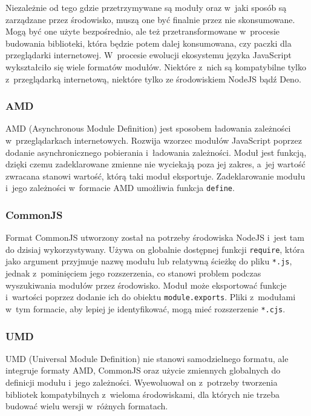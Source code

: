Niezależnie od tego gdzie przetrzymywane są moduły oraz w~jaki sposób są zarządzane przez środowisko, muszą one być finalnie przez nie skonsumowane. Mogą być one użyte bezpośrednio, ale też przetransformowane w~procesie budowania biblioteki, która będzie potem dalej konsumowana, czy paczki dla przeglądarki internetowej. W~procesie ewolucji ekosystemu języka JavaScript wykształciło się wiele formatów modułów. Niektóre z~nich są kompatybilne tylko z~przeglądarką internetową, niektóre tylko ze środowiskiem NodeJS bądź Deno.  

\subsubsection{AMD}

AMD (Asynchronous Module Definition) jest sposobem ładowania zależności w~przeglądarkach internetowych. Rozwija wzorzec modułów JavaScript \cite{jsmodulepattern} poprzez dodanie asynchronicznego pobierania i~ładowania zależności. Moduł jest funkcją, dzięki czemu zadeklarowane zmienne nie wyciekają poza jej zakres, a~jej wartość zwracana stanowi wartość, którą taki moduł eksportuje. Zadeklarowanie modułu i~jego zależności w~formacie AMD umożliwia funkcja \lstinline{define}.

\subsubsection{CommonJS}

Format CommonJS utworzony został na potrzeby środowiska NodeJS i~jest tam do dzisiaj wykorzystywany. Używa on globalnie dostępnej funkcji \lstinline{require}, która jako argument przyjmuje nazwę modułu lub relatywną ścieżkę do pliku \lstinline{*.js}, jednak z~pominięciem jego rozszerzenia, co stanowi problem podczas wyszukiwania modułów przez środowisko. Moduł może eksportować funkcje i~wartości poprzez dodanie ich do obiektu \lstinline{module.exports}. Pliki z~modułami w~tym formacie, aby lepiej je identyfikować, mogą mieć rozszerzenie \lstinline{*.cjs}.

\subsubsection{UMD}

UMD (Universal Module Definition) nie stanowi samodzielnego formatu, ale integruje formaty AMD, CommonJS oraz użycie zmiennych globalnych do definicji modułu i~jego zależności. Wyewoluował on z~potrzeby tworzenia bibliotek kompatybilnych z~wieloma środowiskami, dla których nie trzeba budować wielu wersji w~różnych formatach.

